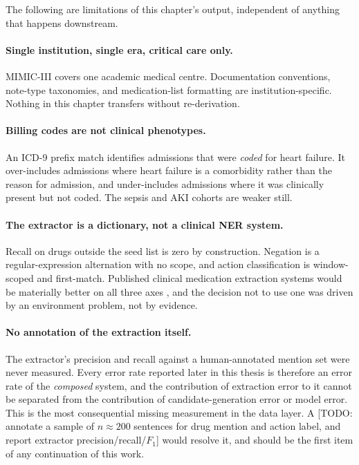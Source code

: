 The following are limitations of this chapter's output, independent of anything
that happens downstream.

\paragraph{Single institution, single era, critical care only.} MIMIC-III covers
one academic medical centre. Documentation conventions, note-type taxonomies,
and medication-list formatting are institution-specific. Nothing in this chapter
transfers without re-derivation.

\paragraph{Billing codes are not clinical phenotypes.} An ICD-9 prefix match
identifies admissions that were \emph{coded} for heart failure. It over-includes
admissions where heart failure is a comorbidity rather than the reason for
admission, and under-includes admissions where it was clinically present but
not coded. The sepsis and AKI cohorts are weaker still.

\paragraph{The extractor is a dictionary, not a clinical NER system.} Recall on
drugs outside the seed list is zero by construction. Negation is a
regular-expression alternation with no scope, and action classification is
window-scoped and first-match. Published clinical medication extraction systems
would be materially better on all three axes \citep{henry2020n2c2}, and the
decision not to use one was driven by an environment problem, not by evidence.

\paragraph{No annotation of the extraction itself.} The extractor's precision
and recall against a human-annotated mention set were never measured. Every
error rate reported later in this thesis is therefore an error rate of the
\emph{composed} system, and the contribution of extraction error to it cannot
be separated from the contribution of candidate-generation error or model error.
This is the most consequential missing measurement in the data layer. A
[TODO: annotate a sample of $n \approx 200$ sentences for drug mention and
action label, and report extractor precision/recall/$F_1$] would resolve it, and
should be the first item of any continuation of this work.

